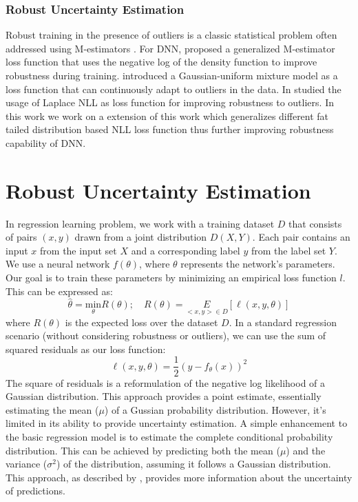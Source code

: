 \documentclass[letterpaper, 10 pt, conference]{ieeeconf}  %
\begin{document}
\subsubsection*{{\textbf{Robust Uncertainty Estimation}}}
Robust training in the presence of outliers is a classic statistical problem often addressed using M-estimators \cite{huber2004robust}. For DNN, \cite{barron2019general} proposed a generalized M-estimator loss function that uses the negative log of the density function to improve robustness during training. \cite{lathuiliere2018deepgum} introduced a Gaussian-uniform mixture model as a loss function that can continuously adapt to outliers in the data. In \cite{nair_laplace_2O22} studied the usage of Laplace NLL as loss function for improving robustness to outliers. 
In this work we work on a extension of this work which generalizes different fat tailed distribution based NLL loss function thus further improving robustness capability of DNN.


\section{Robust Uncertainty Estimation}
In regression learning problem, we work with a training dataset $D$ that consists of pairs $(x, y)$ drawn from a joint distribution $D(X, Y)$. Each pair contains an input $x$ from the input set $X$ and a corresponding label $y$ from the label set $Y$.
We use a neural network $f(\theta)$, where $\theta$ represents the network's parameters. Our goal is to train these parameters by minimizing an empirical loss function $l$. This can be expressed as:
\begin{equation*}
\hat{\theta} = \underset{\theta}{\text{min}} R(\theta)  ;\quad  R(\theta) = \underset{<x,y> \in D}{E} [\ell (x,y,\theta)]
\end{equation*}
where $R(\theta)$ is the expected loss over the dataset $D$.
In a standard regression scenario (without considering robustness or outliers), we can use the sum of squared residuals as our loss function:
\begin{equation*} 
\ell(x,y, \theta) = \frac{1}{2}(y - f_\theta(x))^2
 \end{equation*}   
 The square of residuals is a reformulation of the negative log likelihood of a Gaussian distribution. This approach provides a point estimate, essentially estimating the mean ($\mu$) of a Gussian probability distribution. However, it's limited in its ability to provide uncertainty estimation. A simple enhancement to the basic regression model is to estimate the complete conditional probability distribution. This can be achieved by predicting both the mean ($\mu$) and the variance ($\sigma^{2}$) of the distribution, assuming it follows a Gaussian distribution. This approach, as described by \cite{nix1994estimating}, provides more information about the uncertainty of predictions.
\end{document}
